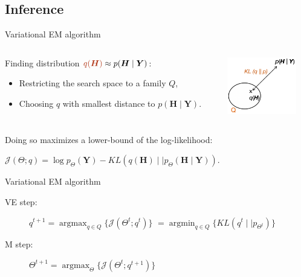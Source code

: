 \documentclass[11pt]{beamer}
\newcommand\J{\mathcal{J}}
\newcommand\Hb{{\boldsymbol{H}}}
\newcommand{\Ybf}{{\boldsymbol{Y}}}
\newcommand{\emphase}[1]{\textcolor{Complement}{#1}}
\newcommand{\argmin}{\mathop{\mathrm{argmin}}}
\newcommand{\argmax}{\mathop{\mathrm{argmax}}}
\begin{document}
\subsection{Inference}
\begin{frame}{Variational EM algorithm}
\begin{columns}
\begin{column}{0.7\linewidth}
Finding  distribution  $\emphase{q(\Hb)}\approx p(\Hb\mid\Ybf)$:\\

\begin{itemize}
\item Restricting the search space to a family $Q$,
\item Choosing $q$ with smallest distance to $p(\Hb\mid\Ybf)$.\\
\end{itemize}
\end{column}
\begin{column}{0.25\linewidth}
\includegraphics[width=3cm]{images/VEM.png}
\end{column}
\end{columns}
\bigskip

Doing so maximizes a lower-bound of the log-likelihood:
\begin{center}
$\J ( \Theta ; q) = \log p_{\Theta }(\Ybf)  - KL(q(\Hb) \mid\mid p_{\Theta }(\Hb\mid\Ybf)).$
\end{center}

\begin{block}{Variational EM algorithm}
\begin{description}
\item[VE step:] \small{$q^{t+1}=\argmax_{q\in Q } \big\{\J( \Theta^t ; q^t) \big\}$ $= \argmin_{q\in Q } \big\{KL(q^t\mid\mid p_{\Theta^t }) \big\} $}
\item[M step:]$\Theta^{t+1} = \argmax_{\Theta } \big\{\J( \Theta^t; q^{t+1}) \big\}$\normalsize
\end{description}
\end{block}
\end{frame}
\end{document}
